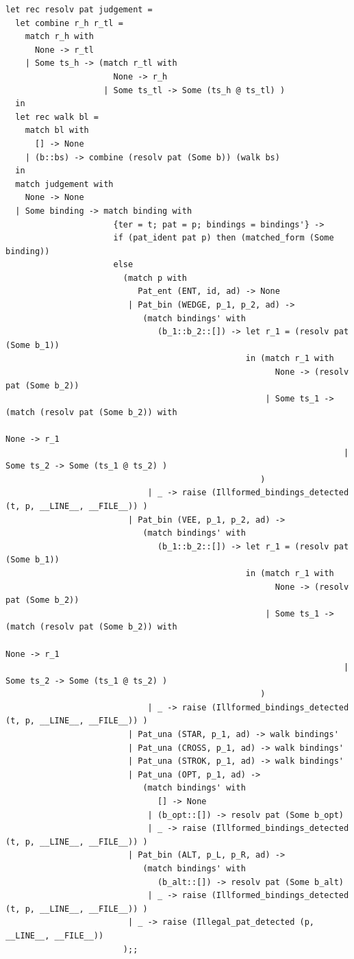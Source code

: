 \documentclass[12pt]{article}
\begin{document}
\begin{tiny}
\begin{verbatim}
let rec resolv pat judgement =
  let combine r_h r_tl =
    match r_h with
      None -> r_tl
    | Some ts_h -> (match r_tl with
                      None -> r_h
                    | Some ts_tl -> Some (ts_h @ ts_tl) )
  in
  let rec walk bl =
    match bl with
      [] -> None
    | (b::bs) -> combine (resolv pat (Some b)) (walk bs)
  in
  match judgement with
    None -> None
  | Some binding -> match binding with
                      {ter = t; pat = p; bindings = bindings'} ->
                      if (pat_ident pat p) then (matched_form (Some binding))
                      else
                        (match p with
                           Pat_ent (ENT, id, ad) -> None
                         | Pat_bin (WEDGE, p_1, p_2, ad) ->
                            (match bindings' with
                               (b_1::b_2::[]) -> let r_1 = (resolv pat (Some b_1))
                                                 in (match r_1 with
                                                       None -> (resolv pat (Some b_2))
                                                     | Some ts_1 -> (match (resolv pat (Some b_2)) with
                                                                       None -> r_1
                                                                     | Some ts_2 -> Some (ts_1 @ ts_2) )
                                                    )
                             | _ -> raise (Illformed_bindings_detected (t, p, __LINE__, __FILE__)) )
                         | Pat_bin (VEE, p_1, p_2, ad) ->
                            (match bindings' with
                               (b_1::b_2::[]) -> let r_1 = (resolv pat (Some b_1))
                                                 in (match r_1 with
                                                       None -> (resolv pat (Some b_2))
                                                     | Some ts_1 -> (match (resolv pat (Some b_2)) with
                                                                       None -> r_1
                                                                     | Some ts_2 -> Some (ts_1 @ ts_2) )
                                                    )
                             | _ -> raise (Illformed_bindings_detected (t, p, __LINE__, __FILE__)) )
                         | Pat_una (STAR, p_1, ad) -> walk bindings'
                         | Pat_una (CROSS, p_1, ad) -> walk bindings'
                         | Pat_una (STROK, p_1, ad) -> walk bindings'
                         | Pat_una (OPT, p_1, ad) ->
                            (match bindings' with
                               [] -> None
                             | (b_opt::[]) -> resolv pat (Some b_opt)
                             | _ -> raise (Illformed_bindings_detected (t, p, __LINE__, __FILE__)) )
                         | Pat_bin (ALT, p_L, p_R, ad) ->
                            (match bindings' with
                               (b_alt::[]) -> resolv pat (Some b_alt)
                             | _ -> raise (Illformed_bindings_detected (t, p, __LINE__, __FILE__)) )
                         | _ -> raise (Illegal_pat_detected (p, __LINE__, __FILE__))
                        );;



\end{verbatim}
\end{tiny}
\end{document}
